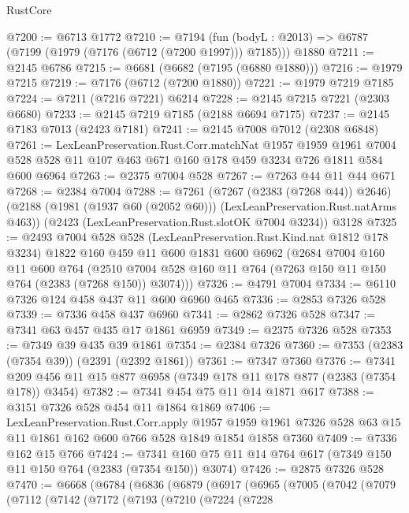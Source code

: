 \begin{lexlean}{RustCore}
\begin{coremodule}
@7200 := @6713 @1772
@7210 := @7194
    (fun (bodyL : @2013) => @6787 (@7199 (@1979 (@7176 (@6712 (@7200 @1997))) @7185)))
    @1880
@7211 := @2145 @6786
@7215 := @6681 (@6682 (@7195 (@6880 @1880)))
@7216 := @1979 @7215
@7219 := @7176 (@6712 (@7200 @1880))
@7221 := @1979 @7219 @7185
@7224 := @7211 (@7216 @7221) @6214
@7228 := @2145 @7215 @7221 (@2303 @6680)
@7233 := @2145 @7219 @7185 (@2188 @6694 @7175)
@7237 := @2145 @7183 @7013 (@2423 @7181)
@7241 := @2145 @7008 @7012 (@2308 @6848)
@7261 := LexLeanPreservation.Rust.Corr.matchNat
    @1957
    @1959
    @1961
    @7004
    @528
    @528
    @11
    @107
    @463
    @671
    @160
    @178
    @459
    @3234
    @726
    @1811
    @584
    @600
    @6964
@7263 := @2375 @7004 @528
@7267 := @7263 @44 @11 @44 @671
@7268 := @2384 @7004
@7288 := @7261
    (@7267 (@2383 (@7268 @44)) @2646)
    (@2188 (@1981 (@1937 @60 (@2052 @60))) (LexLeanPreservation.Rust.natArms @463))
    (@2423 (LexLeanPreservation.Rust.slotOK @7004 @3234))
    @3128
@7325 := @2493
    @7004
    @528
    @528
    (LexLeanPreservation.Rust.Kind.nat @1812 @178 @3234)
    @1822
    @160
    @459
    @11
    @600
    @1831
    @600
    @6962
    (@2684
      @7004
      @160
      @11
      @600
      @764
      (@2510 @7004 @528 @160 @11 @764 (@7263 @150 @11 @150 @764 (@2383 (@7268 @150)) @3074)))
@7326 := @4791 @7004
@7334 := @6110 @7326 @124 @458 @437 @11 @600 @6960 @465
@7336 := @2853 @7326 @528
@7339 := @7336 @458 @437 @6960
@7341 := @2862 @7326 @528
@7347 := @7341 @63 @457 @435 @17 @1861 @6959
@7349 := @2375 @7326 @528
@7353 := @7349 @39 @435 @39 @1861
@7354 := @2384 @7326
@7360 := @7353 (@2383 (@7354 @39)) (@2391 (@2392 @1861))
@7361 := @7347 @7360
@7376 := @7341 @209 @456 @11 @15 @877 @6958 (@7349 @178 @11 @178 @877 (@2383 (@7354 @178)) @3454)
@7382 := @7341 @454 @75 @11 @14 @1871 @617
@7388 := @3151 @7326 @528 @454 @11 @1864 @1869
@7406 := LexLeanPreservation.Rust.Corr.apply
    @1957
    @1959
    @1961
    @7326
    @528
    @63
    @15
    @11
    @1861
    @162
    @600
    @766
    @528
    @1849
    @1854
    @1858
    @7360
@7409 := @7336 @162 @15 @766
@7424 := @7341 @160 @75 @11 @14 @764 @617 (@7349 @150 @11 @150 @764 (@2383 (@7354 @150)) @3074)
@7426 := @2875 @7326 @528
@7470 := @6668
    (@6784
      (@6836
        (@6879
          (@6917
            (@6965
              (@7005
                (@7042
                  (@7079
                    (@7112
                      (@7142
                        (@7172
                          (@7193
                            (@7210
                              (@7224
                                (@7228

\end{coremodule}
\end{lexlean}
